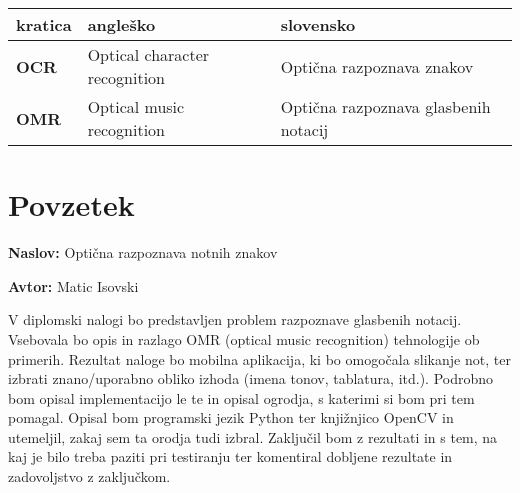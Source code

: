 \documentclass[a4paper, 12pt]{book}
\newcommand{\ttitle}{Optična razpoznava notnih znakov}
\newcommand{\tauthor}{Matic Isovski}
\newcommand{\clearemptydoublepage}{\newpage{\pagestyle{empty}\cleardoublepage}}
\begin{document}
\begin{comment}
\begin{tabular}{l|l|l}
  {\bf kratica} & {\bf angleško} & {\bf slovensko} \\ \hline
  {\bf CA} & classification accuracy & klasifikacijska točnost \\
  {\bf DBMS} & database management system & sistem za upravljanje podatkovnih baz \\
  {\bf SVM} & support vector machine & metoda podpornih vektorjev \\
  \dots & \dots & \dots \\
\end{tabular}
\end{comment}

\noindent\begin{tabular}{p{}|p{}|p{}}    %
  {\bf kratica} & {\bf angleško}                             & {\bf slovensko} \\ \hline
  {\bf OCR}      & Optical character recognition              & Optična razpoznava znakov \\
  {\bf OMR}      & Optical music recognition               & Optična razpoznava glasbenih notacij \\
\end{tabular}


\clearemptydoublepage

\chapter*{Povzetek}

\noindent\textbf{Naslov:} \ttitle
\bigskip

\noindent\textbf{Avtor:} \tauthor
\bigskip

\noindent V diplomski nalogi bo predstavljen problem razpoznave glasbenih notacij. Vsebovala bo opis in razlago OMR (optical music recognition) tehnologije ob primerih. Rezultat naloge bo mobilna aplikacija, ki bo omogočala slikanje not, ter izbrati znano/uporabno obliko izhoda (imena tonov, tablatura, itd.). Podrobno bom opisal implementacijo le te in opisal ogrodja, s katerimi si bom pri tem pomagal. Opisal bom programski jezik Python ter knjižnjico OpenCV in utemeljil, zakaj sem ta orodja tudi izbral. Zaključil bom z rezultati in s tem, na kaj je bilo treba paziti pri testiranju ter komentiral dobljene rezultate in zadovoljstvo z zaključkom.
\end{document}
